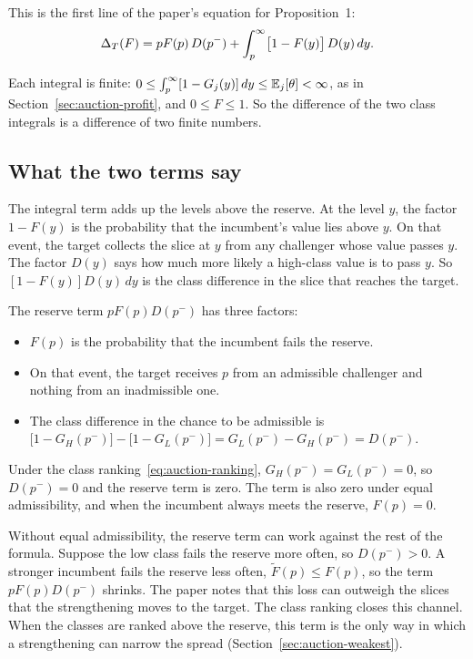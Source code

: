 This is the first line of the paper's equation for Proposition~1:
\begin{equation}\label{eq:auction-spread}
\Delta_T(F)=pF(p)\,D(p^-)+\int_p^\infty\bigl[1-F(y)\bigr]\,D(y)\,dy.
\end{equation}

Each integral is finite: \(0\le\int_p^\infty[1-G_j(y)]\,dy\le\mathbb{E}_j[\theta]<\infty\), as in
Section~\ref{sec:auction-profit}, and \(0\le F\le1\). So the difference of the two class integrals is a
difference of two finite numbers.

\subsection*{What the two terms say}

The integral term adds up the levels above the reserve. At the level \(y\), the factor \(1-F(y)\) is the
probability that the incumbent's value lies above \(y\). On that event, the target collects the slice at \(y\)
from any challenger whose value passes \(y\). The factor \(D(y)\) says how much more likely a high-class value is
to pass \(y\). So \([1-F(y)]D(y)\,dy\) is the class difference in the slice that reaches the target.

The reserve term \(pF(p)D(p^-)\) has three factors:
\begin{itemize}
\item \(F(p)\) is the probability that the incumbent fails the reserve.
\item On that event, the target receives \(p\) from an admissible challenger and nothing from an inadmissible one.
\item The class difference in the chance to be admissible is
\(\bigl[1-G_H(p^-)\bigr]-\bigl[1-G_L(p^-)\bigr]=G_L(p^-)-G_H(p^-)=D(p^-)\).
\end{itemize}
Under the class ranking~\eqref{eq:auction-ranking}, \(G_H(p^-)=G_L(p^-)=0\), so \(D(p^-)=0\) and the reserve term
is zero. The term is also zero under equal admissibility, and when the incumbent always meets the reserve,
\(F(p)=0\).

\begin{watchout}
Without equal admissibility, the reserve term can work against the rest of the formula. Suppose the low class
fails the reserve more often, so \(D(p^-)>0\). A stronger incumbent fails the reserve less often,
\(\tilde F(p)\le F(p)\), so the term \(pF(p)D(p^-)\) shrinks. The paper notes that this loss can outweigh the
slices that the strengthening moves to the target. The class ranking closes this channel. When the classes are
ranked above the reserve, this term is the only way in which a strengthening can narrow the spread
(Section~\ref{sec:auction-weakest}).
\end{watchout}

